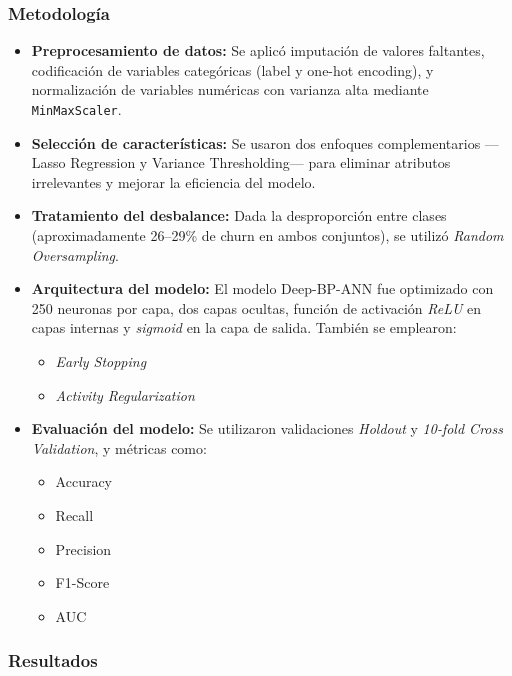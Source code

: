 \documentclass[
  letterpaper,
  DIV=11,
  numbers=noendperiod]{scrartcl}
\providecommand{\tightlist}{%
  \setlength{\itemsep}{0pt}\setlength{\parskip}{0pt}}\usepackage{longtable,booktabs,array}
\begin{document}
\subsubsection{Metodología}\label{metodologuxeda}

\begin{itemize}
\item
  \textbf{Preprocesamiento de datos:} Se aplicó imputación de valores
  faltantes, codificación de variables categóricas (label y one-hot
  encoding), y normalización de variables numéricas con varianza alta
  mediante \texttt{MinMaxScaler}.
\item
  \textbf{Selección de características:} Se usaron dos enfoques
  complementarios ---Lasso Regression y Variance Thresholding--- para
  eliminar atributos irrelevantes y mejorar la eficiencia del modelo.
\item
  \textbf{Tratamiento del desbalance:} Dada la desproporción entre
  clases (aproximadamente 26--29\% de churn en ambos conjuntos), se
  utilizó \emph{Random Oversampling}.
\item
  \textbf{Arquitectura del modelo:} El modelo Deep-BP-ANN fue optimizado
  con 250 neuronas por capa, dos capas ocultas, función de activación
  \emph{ReLU} en capas internas y \emph{sigmoid} en la capa de salida.
  También se emplearon:

  \begin{itemize}
  \tightlist
  \item
    \emph{Early Stopping}
  \item
    \emph{Activity Regularization}
  \end{itemize}
\item
  \textbf{Evaluación del modelo:} Se utilizaron validaciones
  \emph{Holdout} y \emph{10-fold Cross Validation}, y métricas como:

  \begin{itemize}
  \tightlist
  \item
    Accuracy
  \item
    Recall
  \item
    Precision
  \item
    F1-Score
  \item
    AUC
  \end{itemize}
\end{itemize}

\subsubsection{Resultados}\label{resultados}
\end{document}
